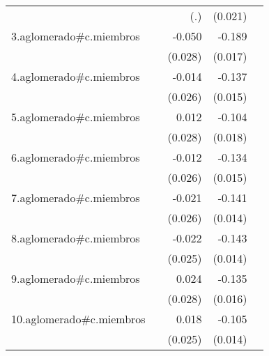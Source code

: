 {\begin{longtable}{l*{4}{D{.}{.}{-1}}}
            &                     &         (.)         &     (0.021)         &                     \\
\addlinespace
3.aglomerado#c.miembros&                     &      -0.050         &      -0.189\sym{***}&                     \\
            &                     &     (0.028)         &     (0.017)         &                     \\
\addlinespace
4.aglomerado#c.miembros&                     &      -0.014         &      -0.137\sym{***}&                     \\
            &                     &     (0.026)         &     (0.015)         &                     \\
\addlinespace
5.aglomerado#c.miembros&                     &       0.012         &      -0.104\sym{***}&                     \\
            &                     &     (0.028)         &     (0.018)         &                     \\
\addlinespace
6.aglomerado#c.miembros&                     &      -0.012         &      -0.134\sym{***}&                     \\
            &                     &     (0.026)         &     (0.015)         &                     \\
\addlinespace
7.aglomerado#c.miembros&                     &      -0.021         &      -0.141\sym{***}&                     \\
            &                     &     (0.026)         &     (0.014)         &                     \\
\addlinespace
8.aglomerado#c.miembros&                     &      -0.022         &      -0.143\sym{***}&                     \\
            &                     &     (0.025)         &     (0.014)         &                     \\
\addlinespace
9.aglomerado#c.miembros&                     &       0.024         &      -0.135\sym{***}&                     \\
            &                     &     (0.028)         &     (0.016)         &                     \\
\addlinespace
10.aglomerado#c.miembros&                     &       0.018         &      -0.105\sym{***}&                     \\
            &                     &     (0.025)         &     (0.014)         &                     \\

\end{longtable}}
